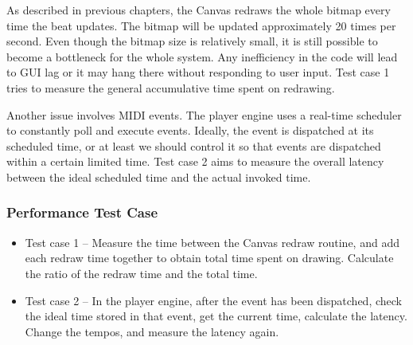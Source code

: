 As described in previous chapters, the Canvas redraws the whole bitmap every time 
the beat updates. The bitmap will be updated approximately 20 times per second.
Even though the bitmap size is relatively small, it is still possible to become 
a bottleneck for the whole system. Any inefficiency in the code will lead to GUI 
lag or it may hang there without responding to user input. Test case 1 tries 
to measure the general accumulative time spent on redrawing. 

Another issue involves MIDI events. The player engine uses a real-time scheduler to  
constantly poll and execute events. Ideally, the event is dispatched at its 
scheduled time, or at least we should control it so that events are dispatched within 
a certain limited time. Test case 2 aims to measure the overall latency between 
the ideal scheduled time and the actual invoked time. 
\subsubsection{Performance Test Case}
\begin{itemize}
  \item Test case 1 -- Measure the time between the Canvas redraw routine, and 
        add each redraw time together to obtain total time spent on drawing. 
        Calculate the ratio of the redraw time and the total time.
  \item Test case 2 -- In the player engine, after the event has been dispatched, 
        check the ideal time stored in that event, get the current time, calculate 
        the latency. Change the tempos, and measure the latency again.
\end{itemize}
